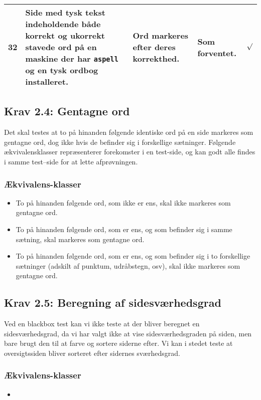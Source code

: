 \documentclass[a4paper,oneside,article]{memoir}
\begin{document}
\begin{landscape}
\begin{longtable}[c]{p{20pt}|p{220pt}|p{130pt}|p{130pt}|r}
32 &
Side med tysk tekst indeholdende både korrekt og ukorrekt stavede ord
på en maskine der har \texttt{aspell} og en tysk ordbog installeret. &
Ord markeres efter deres korrekthed. &
Som forventet. &
$\surd$ \\ \hline

\end{longtable}

\subsection{Krav 2.4: Gentagne ord}

Det skal testes at to på hinanden følgende identiske ord på en side
markeres som gentagne ord, dog ikke hvis de befinder sig i forskellige
sætninger. Følgende ækvivalensklasser repræsenterer forekomster i en
test-side, og kan godt alle findes i samme test--side for at lette
afprøvningen.

\subsubsection{Ækvivalens-klasser}
\begin{itemize}
\item To på hinanden følgende ord, som ikke er ens, skal ikke
  markeres som gentagne ord.
\item To på hinanden følgende ord, som er ens, og som befinder sig i
  samme sætning, skal markeres som gentagne ord.
\item To på hinanden følgende ord, som er ens, og som befinder sig i
  to forskellige sætninger (adskilt af punktum, udråbstegn, osv), skal
  ikke markeres som gentagne ord.
\end{itemize}

\subsection{Krav 2.5: Beregning af sidesværhedsgrad}
Ved en blackbox test kan vi ikke teste at der bliver beregnet en
sidesværhedsgrad, da vi har valgt ikke at vise sidesværhedsgraden på
siden, men bare brugt den til at farve og sortere siderne efter. Vi
kan i stedet teste at oversigtssiden bliver sorteret efter sidernes
sværhedsgrad.

\subsubsection{Ækvivalens-klasser}
\begin{itemize}
\item 
\end{itemize}


\end{landscape}
\end{document}
